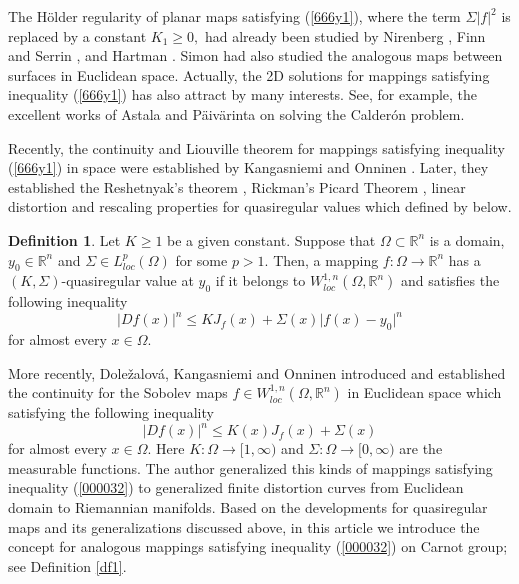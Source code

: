 \documentclass[11pt,twoside]{article}
\theoremstyle{definition}
\newtheorem{defn}{Definition}[section]
\theoremstyle{remark}
\begin{document}
The H\"{o}lder regularity of planar maps satisfying  (\ref{666y1}), where the term $\Sigma\vert f\vert^{2}$  is replaced by a constant $K_{1}\geq0,$ 
 had already been studied by Nirenberg \cite{Nir53}, Finn and Serrin \cite{FS58}, and Hartman \cite{Har58}.  Simon \cite{Sim77} had also studied the analogous maps between surfaces in Euclidean space. Actually, the 2D solutions for mappings satisfying inequality (\ref{666y1}) has also attract by many interests. See, for example, the excellent works of Astala and P\"{a}iv\"{a}rinta \cite{AP06} on solving the Calder\'{o}n problem.
 
 Recently, the continuity and Liouville theorem  for mappings satisfying inequality (\ref{666y1}) in space were established by Kangasniemi and  Onninen \cite{KO221}. Later, they established the Reshetnyak’s theorem \cite{KO222}, Rickman’s Picard Theorem \cite{KO242},  linear distortion and rescaling properties \cite{KO241} for quasiregular values which defined by below.
 \begin{defn}\cite[Definition 1.1]{KO222} 
   Let $K\geq1$ be a given constant. Suppose that $\Omega\subset\mathbb{R}^{n}$  is a domain, $y_{0}\in\mathbb{R}^{n}$ and $\Sigma\in L_{loc}^{p}(\Omega)$ for some $p>1.$  Then, a mapping $f:\Omega\rightarrow\mathbb{R}^{n}$ has a $(K,\Sigma)$-quasiregular value at $y_{0}$ if it belongs to $W_{loc}^{1,n}(\Omega, \mathbb{R}^{n})$ and satisfies the following inequality
  \begin{equation}
  \vert Df(x)\vert^{n}\leq KJ_{f}(x)+\Sigma(x)\vert f(x)-y_{0}\vert^{n}
  \end{equation}
  for almost every $x\in\Omega.$
  \end{defn}

 More recently, Dole\v{z}alov\'{a},  Kangasniemi and Onninen \cite{DKO24} introduced and established the continuity for the Sobolev maps $f\in W_{loc}^{1,n}(\Omega,\mathbb{R}^{n})$ in Euclidean space which satisfying the following inequality
\begin{equation}\label{000032}
\vert Df(x)\vert^{n}\leq K(x) J_{f}(x)+\Sigma(x)
\end{equation}
for almost every $x\in\Omega.$ Here $K:\Omega\rightarrow[1,\infty)$ and $\Sigma:\Omega\rightarrow[0,\infty)$ are the measurable functions. The author \cite{Zho25} generalized this kinds of mappings satisfying inequality (\ref{000032}) to generalized finite distortion curves from Euclidean domain to Riemannian manifolds. Based on the developments for quasiregular maps and its generalizations discussed above, in this article we introduce the concept for analogous mappings satisfying inequality (\ref{000032}) on Carnot group; see Definition \ref{df1}. 
\end{document}

